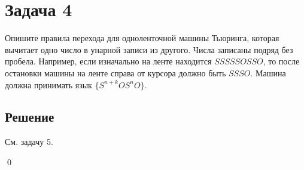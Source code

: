 \section{Задача 4}
Опишите правила перехода для одноленточной машины Тьюринга,
которая вычитает одно число в унарной записи из другого.
Числа записаны подряд без пробела.
Например, если изначально на ленте находится $SSSSSOSSO$,
то после остановки машины на ленте справа от
курсора должно быть $SSSO$.
Машина должна принимать язык $\{S^{n+k} O S^n O\}$.

\subsection{Решение}
См. задачу 5.

\qed
